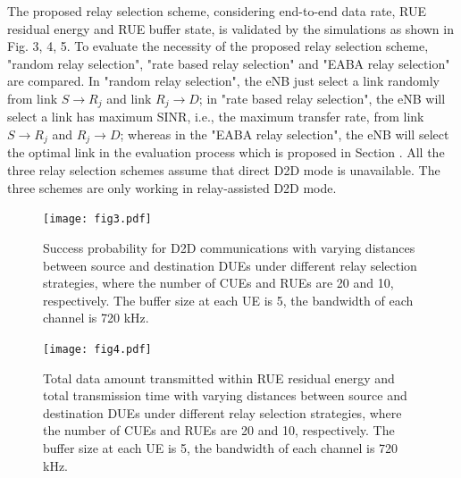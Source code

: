 \documentclass[conference]{IEEEtran}
\begin{document}
The proposed relay selection scheme, considering end-to-end data rate, RUE residual energy and RUE buffer state, is validated by the simulations as shown in Fig. 3, 4, 5. To evaluate the necessity of the proposed relay selection scheme, "random relay selection", "rate based relay selection" and "EABA relay selection" are compared. In "random relay selection", the eNB just select a link randomly from link $S\rightarrow R_j$ and link $R_j\rightarrow D$; in "rate based relay selection", the eNB will select a link has maximum SINR, i.e., the maximum transfer rate, from link $S\rightarrow R_j$ and $R_j\rightarrow D$; whereas in the "EABA relay selection", the eNB will select the optimal link in the evaluation process which is proposed in Section \uppercase\expandafter{}. All the three relay selection schemes assume that direct D2D mode is unavailable. The three schemes are only working in relay-assisted D2D mode.

\begin{figure}[!t]
\texttt{[image: fig3.pdf]}
\caption{Success probability for D2D communications with varying distances between source and destination DUEs under different relay selection strategies, where the number of CUEs and RUEs are 20 and 10, respectively. The buffer size at each UE is 5, the bandwidth of each channel is 720 kHz.}
\label{fig_success}
\end{figure}
\begin{figure}[!t]
\center
\texttt{[image: fig4.pdf]}
\caption{Total data amount transmitted within RUE residual energy and total transmission time with varying distances between source and destination DUEs under different relay selection strategies, where the number of CUEs and RUEs are 20 and 10, respectively. The buffer size at each UE is 5, the bandwidth of each channel is 720 kHz.}
\label{fig_time}
\end{figure}
\end{document}
